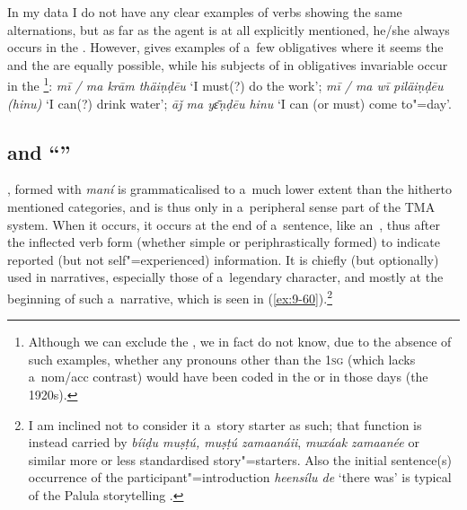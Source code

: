 In my data I do not have any clear examples of  verbs showing the same alternations, but as far as the agent is at all explicitly mentioned, he/she always occurs in the . However, \citet[24]{morgenstierne1941} gives examples of a~few  obligatives where it seems the  and the  are equally possible, while his subjects of in obligatives invariable occur in the \footnote{Although we can exclude the , we in fact do not know, due to the absence of such examples, whether any pronouns other than the \textsc{1sg} (which lacks a~nom/acc contrast) would have been coded in the  or  in those days (the 1920s).}: \textit{mī / ma krām thäiṇḍēu} `I must(?) do the work'; \textit{mī / ma wī piläiṇḍēu (hinu)} `I can(?) drink water'; \textit{āǰ ma yɛ̄ṇḍēu hinu} `I can (or must) come to"=day'.


\subsection{ and ``''}
\label{subsec:9-2-4}

, formed with \textit{maní} is grammaticalised to a~much lower extent than the hitherto mentioned categories, and is thus only in a~peripheral sense part of the TMA system. When it occurs, it occurs at the end of a~sentence, like an~, thus after the inflected  verb form (whether simple or periphrastically formed) to indicate reported (but not self"=experienced) information. It is chiefly (but optionally) used in narratives, especially those of a~legendary character, and mostly at the beginning of such a~narrative, which is seen in (\ref{ex:9-60}).\footnote{I am inclined not to consider it a~story starter as such; that function is instead carried by \textit{bíiḍu muṣṭú, muṣṭú zamaanáii}, \textit{muxáak zamaanée} or similar more or less standardised story"=starters. Also the initial sentence(s) occurrence of the participant"=introduction \textit{heensílu de} `there was' is typical of the Palula storytelling .} 

